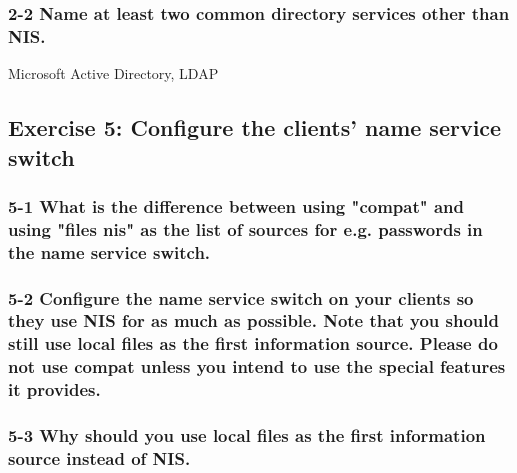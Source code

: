 \subsubsection{2-2 Name at least two common directory services other than NIS.}
Microsoft Active Directory, LDAP


\subsection{Exercise 5: Configure the clients' name service switch}
\subsubsection{5-1 What is the difference between using "compat" and using "files nis" as the list of sources for e.g. passwords in the name service switch.}

\subsubsection{5-2 Configure the name service switch on your clients so they use NIS for as much as possible. Note that you should still use local files as the first information source. Please do not use compat unless you intend to use the special features it provides.}

\subsubsection{5-3 Why should you use local files as the first information source instead of NIS.}







